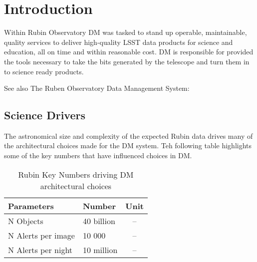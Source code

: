 \section{Introduction}

Within Rubin Observatory DM was tasked to stand up operable, maintainable, quality services to deliver high-quality LSST data products for science and education, all on time and within reasonable cost.
DM is responsible for provided the tools necessary to take the bits generated by the telescope and turn them in to science ready products.

 See also The Ruben Observatory  Data Management System: \cite{2015arXiv151207914J}


\subsection{Science Drivers}
The astronomical size and complexity of the expected Rubin data drives many of the architectural choices made for the DM system. Teh following table highlights some of the key numbers that have influenced choices in DM.

\begin{table}[ht]
\caption{Rubin Key Numbers driving DM architectural choices}
\label{tab:dm_keynumbers}
\begin{center}
\begin{tabular}{|l|l|c|} %

\hline
\rule[-1ex]{0pt}{3.5ex}  {\bf Parameters} & {\bf Number} & {\bf Unit}\\
\hline
N Objects & 40 billion & -- \\
N Alerts per image & 10 000 & -- \\
N Alerts per night & 10 million & -- \\
\hline
\end{tabular}
\end{center}
\end{table}
